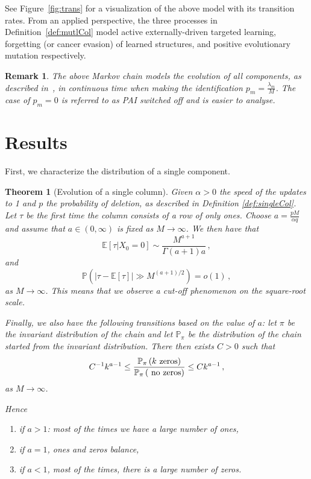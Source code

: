 \documentclass{article}
\numberwithin{equation}{section}
\newcommand{\ek}[1]{\left[#1\right]}
\newcommand{\rk}[1]{\left(#1\right)}
\newcommand{\abs}[1]{\left| #1 \right|}
\renewcommand{\P}   {\mathbb{P}}
\newcommand{\E}     {\mathbb{E}}
\renewcommand{\l}{\lambda}
\newcommand{\1}{\mathbbm{1}}
\renewcommand{\P}{\mathbb{P}}
\newtheorem*{remark}{Remark}
\newtheorem{theorem}{Theorem}
\begin{document}
See Figure~\ref{fig:trans} for a visualization of the above model with its transition rates. From an applied perspective, the three processes in Definition~\ref{def:mutlCol} model active externally-driven targeted learning, forgetting (or cancer evasion) of learned structures, and positive evolutionary mutation respectively.

\begin{remark}
    The above Markov chain models the evolution of all components, as described in~\cite{kuehn2025mathematicalmodelsselfadaptiveresponse}, in continuous time when making the identification $p_m=\tfrac{\l_m}{M}$. The case of $p_m=0$ is referred to as PAI switched off and is easier to analyse.
\end{remark}

\section{Results}\label{sec:results}
First, we characterize the distribution of a single component.
\begin{theorem}[Evolution of a single column]\label{thm:singleCol}
    Given $\alpha>0$ the speed of the updates to 1 and $p$ the probability of deletion, as described in Definition \ref{def:singleCol}. Let $\tau$ be the first time the column consists of a row of only ones. Choose $a=\tfrac{p M}{\alpha q}$ and assume that $a\in (0,\infty)$ is fixed as $M\to\infty$. We then have that 
    \begin{equation}
        \E\ek{\tau|X_0=0}\sim  \frac{M^{a+1}}{\Gamma(a+1)a}\, ,
    \end{equation}
    and
    \begin{equation}
        \P\rk{\abs{\tau-\E\ek{\tau}}\gg M^{(a+1)/2}}=o(1)\, ,
    \end{equation}
    as $M\to\infty$. This means that we observe a cut-off phenomenon on the square-root scale.

    Finally, we also have the following transitions based on the value of $a$: let $\pi$ be the invariant distribution of the chain and let $\P_\pi$ be the distribution of the chain started from the invariant distribution. There then exists $C>0$ such that
    \begin{equation}
                C^{-1}k^{a-1}\le \frac{\P_\pi\rk{ k\textnormal{ zeros}}}{\P_\pi\rk{\textnormal{ no zeros}}}\le C k^{a-1}\, ,
        \end{equation}
        as $M\to\infty$.
        
        Hence 
    \begin{enumerate}
        \item if $a>1$: most of the times we have a large number of ones,
        \item if $a=1$, ones and zeros balance,
        \item if $a<1$, most of the times, there is a large number of zeros.
    \end{enumerate}
\end{theorem}
\end{document}
